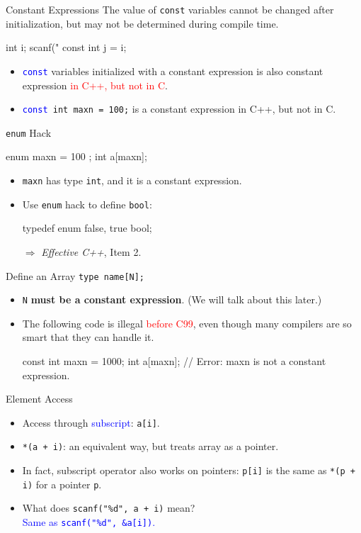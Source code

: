 \documentclass{beamer}
\newcommand{\red}[1]{\textcolor{red}{#1}}
\newcommand{\blue}[1]{\textcolor{blue}{#1}}
\newcommand{\ttt}[1]{\texttt{#1}}
\newcommand{\bluett}[1]{\blue{\ttt{#1}}}
\begin{document}
\begin{frame}[fragile]{Constant Expressions}
	The value of \ttt{const} variables cannot be changed after initialization, but may not be determined during compile time.
	\begin{cpp}
int i;
scanf("%
const int j = i;
	\end{cpp}
	\pause
	\begin{itemize}
		\item \bluett{const} variables initialized with a constant expression is also constant expression \red{in C++, but not in C}.
		\item \bluett{const }\ttt{int maxn = 100;} is a constant expression in C++, but not in C.
	\end{itemize}
\end{frame}

\begin{frame}[fragile]{\ttt{enum} Hack}
	\begin{cpp}
enum { maxn = 100 };
int a[maxn];
	\end{cpp}
	\begin{itemize}
		\item \ttt{maxn} has type \ttt{int}, and it is a constant expression.
		\pause
		\item Use \ttt{enum} hack to define \ttt{bool}:
		\begin{cpp}
typedef enum { false, true } bool;
		\end{cpp}
		\item[\(\Rightarrow\)] \textit{Effective C++}, Item 2.
	\end{itemize}
\end{frame}

\begin{frame}[fragile]{Define an Array}
	\ttt{type name[N];}
	\begin{itemize}
		\item \ttt{N} \textbf{must be a constant expression}. (We will talk about this later.)
		\item The following code is illegal \red{before C99}, even though many compilers are so smart that they can handle it.
		\begin{cpp}
const int maxn = 1000;
int a[maxn]; // Error: maxn is not a constant expression.
		\end{cpp}
	\end{itemize}
\end{frame}

\begin{frame}{Element Access}
	\begin{itemize}
		\item Access through \blue{subscript}: \ttt{a[i]}.
		\pause
		\item \ttt{*(a + i)}: an equivalent way, but treats array as a pointer.
		\item In fact, subscript operator also works on pointers: \ttt{p[i]} is the same as \ttt{*(p + i)} for a pointer \ttt{p}.
		\pause
		\item What does \ttt{scanf("\%d", a + i)} mean?\\
		\pause
		\blue{Same as \ttt{scanf("\%d", \&a[i])}.}
	\end{itemize}
\end{frame}
\end{document}
